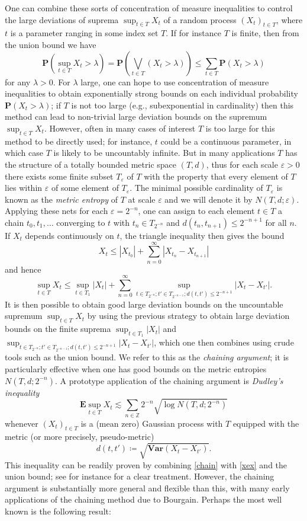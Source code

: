 \documentclass[12pt,a4paper,reqno]{amsart}
\numberwithin{equation}{section}
\theoremstyle{plain}
\theoremstyle{definition}
\newcommand\E{\mathbf{E}}
\renewcommand\P{\mathbf{P}}
\newcommand\Var{\mathbf{Var}}
\newcommand\Z{\mathbb{Z}}
\newcommand\eps{\varepsilon}
\begin{document}
One can combine these sorts of concentration of measure inequalities to control the large deviations of suprema $\sup_{t \in T} X_t$ of a random process $(X_t)_{t \in T}$, where $t$ is a parameter ranging in some index set $T$.  If for instance $T$ is finite, then from the union bound we have
$$ \P( \sup_{t \in T} X_t > \lambda ) = \P( \bigvee_{t \in T}(X_t > \lambda)) \leq \sum_{t \in T} \P(X_t > \lambda)$$
for any $\lambda>0$.  For $\lambda$ large, one can hope to use concentration of measure inequalities to obtain exponentially strong bounds on each individual probability $\P(X_t > \lambda)$; if $T$ is not too large (e.g., subexponential in cardinality) then this method can lead to non-trivial large deviation bounds on the supremum $\sup_{t \in T} X_t$.  However, often in many cases of interest $T$ is too large for this method to be directly used; for instance, $t$ could be a continuous parameter, in which case $T$ is likely to be uncountably infinite.  But in many applications $T$ has the structure of a totally bounded metric space $(T,d)$, thus for each scale $\eps>0$ there exists some finite subset $T_\eps$ of $T$ with the property that every element of $T$ lies within $\eps$ of some element of $T_\eps$.  The minimal possible cardinality of $T_\eps$ is known as the \emph{metric entropy} of $T$ at scale $\eps$ and we will denote it by $N(T, d;\eps)$.  Applying these nets for each $\eps = 2^{-n}$, one can assign to each element $t \in T$ a chain $t_0,t_1,\dots$ converging to $t$ with $t_n \in T_{2^{-n}}$ and $d(t_n,t_{n+1}) \leq 2^{-n+1}$ for all $n$.  If $X_t$ depends continuously on $t$, the triangle inequality then gives the bound
$$ X_t \leq |X_{t_0}| + \sum_{n=0}^\infty |X_{t_n}-X_{t_{n+1}}|$$
and hence
\begin{equation}\label{chain}
 \sup_{t \in T} X_t \leq \sup_{t \in T_1} |X_{t}| + \sum_{n=0}^\infty \sup_{t \in T_{2^{-n}}; t' \in T_{2^{-n-1}}; d(t,t') \leq 2^{-n+1}} |X_{t}-X_{t'}|.
\end{equation}
It is then possible to obtain good large deviation bounds on the uncountable supremum $\sup_{t \in T} X_t$ by using the previous strategy to obtain large deviation bounds on the finite suprema $\sup_{t \in T_1} |X_{t}|$ and $\sup_{t \in T_{2^{-n}}; t' \in T_{2^{-n-1}}; d(t,t') \leq 2^{-n+1}} |X_{t}-X_{t'}|$, which one then combines using crude tools such as the union bound.  We refer to this as the \emph{chaining argument}; it is particularly effective when one has good bounds on the metric entropies $N(T,d;2^{-n})$.  A prototype application of the chaining argument is \emph{Dudley's inequality} \cite{dudley}
$$ \E \sup_{t \in T} X_t \lesssim \sum_{n \in \Z} 2^{-n} \sqrt{\log N(T, d; 2^{-n})}$$
whenever $(X_t)_{t \in T}$ is a (mean zero) Gaussian process with $T$ equipped with the metric (or more precisely, pseudo-metric)
$$ d(t, t') \coloneqq \sqrt{ \Var(X_t-X_{t'})}.$$
This inequality can be readily proven by combining \eqref{chain} with \eqref{xex} and the union bound; see for instance \cite[\S 2]{major} for a clear treatment.  However, the chaining argument is substantially more general and flexible than this, with many early applications of the chaining method due to Bourgain.  Perhaps the most well known is the following result:
\end{document}
